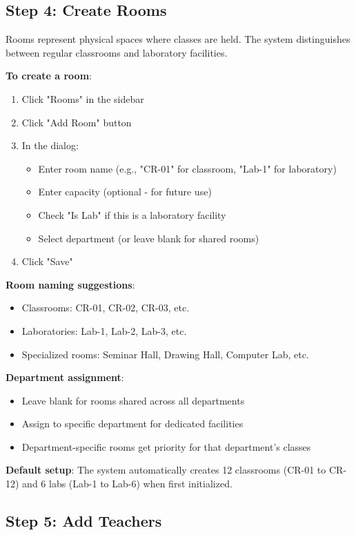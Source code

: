 \documentclass[12pt,a4paper]{article}
\begin{document}
\subsection{Step 4: Create Rooms}

Rooms represent physical spaces where classes are held. The system distinguishes between regular classrooms and laboratory facilities.

\textbf{To create a room}:
\begin{enumerate}
\item Click "Rooms" in the sidebar
\item Click "Add Room" button
\item In the dialog:
\begin{itemize}
\item Enter room name (e.g., "CR-01" for classroom, "Lab-1" for laboratory)
\item Enter capacity (optional - for future use)
\item Check "Is Lab" if this is a laboratory facility
\item Select department (or leave blank for shared rooms)
\end{itemize}
\item Click "Save"
\end{enumerate}

\textbf{Room naming suggestions}:
\begin{itemize}
\item Classrooms: CR-01, CR-02, CR-03, etc.
\item Laboratories: Lab-1, Lab-2, Lab-3, etc.
\item Specialized rooms: Seminar Hall, Drawing Hall, Computer Lab, etc.
\end{itemize}

\textbf{Department assignment}:
\begin{itemize}
\item Leave blank for rooms shared across all departments
\item Assign to specific department for dedicated facilities
\item Department-specific rooms get priority for that department's classes
\end{itemize}

\textbf{Default setup}: The system automatically creates 12 classrooms (CR-01 to CR-12) and 6 labs (Lab-1 to Lab-6) when first initialized.

\subsection{Step 5: Add Teachers}
\end{document}
